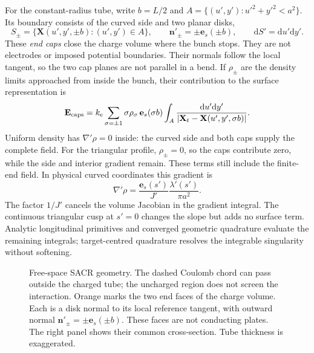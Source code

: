 \documentclass[10pt,a4paper]{article}
\newcommand{\dd}{\mathrm d}
\newcommand{\kC}{k_{\mathrm e}}
\begin{document}
For the constant-radius tube, write $b=L/2$ and
$A=\{(u',y'):u'^2+y'^2<a^2\}$. Its boundary consists of the curved side
and two planar disks,
\begin{equation}
 S_\pm=\{\mathbf X(u',y',\pm b):(u',y')\in A\},\qquad
 \mathbf n'_\pm=\pm\mathbf e_s(\pm b),\qquad
 \dd S'=\dd u'\dd y'.
 \label{eq:cap-geometry}
\end{equation}
These \emph{end caps} close the charge volume where the bunch stops.
They are not electrodes or imposed potential boundaries. Their normals
follow the local tangent, so the two cap planes are not parallel in a bend.
If $\rho_\pm$ are the density limits approached from inside the bunch,
their contribution to the surface representation is
\begin{equation}
 \mathbf E_{\rm caps}=\kC\sum_{\sigma=\pm1}
 \sigma\rho_\sigma\,\mathbf e_s(\sigma b)
 \int_A\frac{\dd u'\dd y'}
 {|\mathbf X_t-\mathbf X(u',y',\sigma b)|}.
 \label{eq:cap-field}
\end{equation}
Uniform density has $\nabla'\rho=0$ inside: the curved side and both caps
supply the complete field. For the triangular profile, $\rho_\pm=0$, so
the caps contribute zero, while the side and interior gradient remain.
These terms still include the finite-end field.
In physical curved coordinates this gradient is
\begin{equation}
 \nabla'\rho=\frac{\mathbf e_s(s')}{J'}
             \frac{\lambda'(s')}{\pi a^2}.
 \label{eq:sacr-gradient}
\end{equation}
The factor $1/J'$ cancels the volume Jacobian in the gradient integral.
The continuous triangular cusp at $s'=0$ changes the slope but adds no
surface term. Analytic longitudinal primitives and converged geometric
quadrature evaluate the remaining integrals; target-centred quadrature
resolves the integrable singularity without softening.
\begin{figure}[ht]
\centering
\caption{Free-space SACR geometry. The dashed Coulomb chord can pass outside
the charged tube; the uncharged region does not screen the interaction.
Orange marks the two end faces of the charge volume. Each is a disk normal
to its local reference tangent, with outward normal
$\mathbf n'_\pm=\pm\mathbf e_s(\pm b)$. These faces are not conducting plates.
The right panel shows their common cross-section. Tube thickness is exaggerated.}
\label{fig:sacr}
\end{figure}
\end{document}

